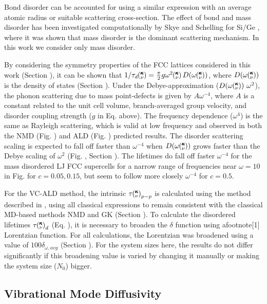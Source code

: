 \documentclass[aps,prb,twocolumn,superscriptaddress,amsmath,amssymb,floatfix]{revtex4}
\newcommand{\kv}{\mspace{-4.0mu}\left(\mspace{-8.0mu}
\begin{smallmatrix}&\pmb{\kappa} \\&\nu\end{smallmatrix}
\mspace{-3.0mu}\right)}
\begin{document}
Bond disorder 
can be accounted for using a similar expression with an average
atomic radius or suitable scattering cross-section.
\cite{klemens_scattering_1955,klemens_thermal_1957} 
The effect of bond and mass disorder has been investigated computationally 
by Skye and 
Schelling for Si/Ge \cite{skye_thermal_2008}, 
where it was shown that mass disorder is 
the dominant scattering mechanism. In this work we consider only 
mass disorder.

By considering the symmetry properties of the FCC lattices 
considered in this work (Section ), it can be shown that  
$1/\tau_{d}\kv =\frac{\pi}{2} g \omega^2\kv D(\omega\kv)$, where 
$D(\omega\kv)$ is the density of states (Section ).
\cite{tamura_isotope_1983}   
Under the Debye-approximation ($D(\omega\kv)~\omega^{2}$), 
the phonon scattering due to mass point-defects 
is given by $A\omega^{-4}$, where $A$ is a constant related to the unit 
cell volume, branch-averaged group velocity, and disorder coupling strength 
($g$ in Eq. above). 
The frequency dependence ($\omega^4$) is the same as 
Rayleigh scattering, which is valid at low frequency and observed 
in both the NMD (Fig. ) and ALD (Fig. ) predicted results. 
The disorder 
scattering scaling is expected to fall off faster than $\omega^{-4}$ 
when $D(\omega\kv)$ grows faster than the Debye scaling of 
$\omega^{2}$ (Fig. , Section ). 
The lifetimes do fall off faster $\omega^{-4}$ for the 
mass disordered LJ FCC supercells for a narrow range of 
frequencies near $\omega = 10$ in Fig. for $c=0.05,0.15$, 
but seem to follow more closely $\omega^{-4}$ for $c=0.5$. 

For the VC-ALD method, 
the intrinsic $\tau\kv_{p-p}$ is calculated using the method described in
\cite{turney_predicting_2009}, using all classical expressions to remain 
consistent with the classical MD-based methods NMD and GK (Section ). 
To calculate the disordered lifetimes $\tau\kv_{d}$ (Eq. ), 
it is necessary to broaden 
the $\delta$ function using afootnote[1] Lorentzian function. 
For all calculations, the Lorentzian was broadened using a value of 
$100\delta_{\omega,avg}$ (Section ). For the system sizes here, 
the results do not differ significantly 
if this broadening value is varied by changing it manually or making 
the system size ($N_0$) bigger.

\subsection{\label{S:Vibrational Mode Diffusivity}
Vibrational Mode Diffusivity}
\end{document}
